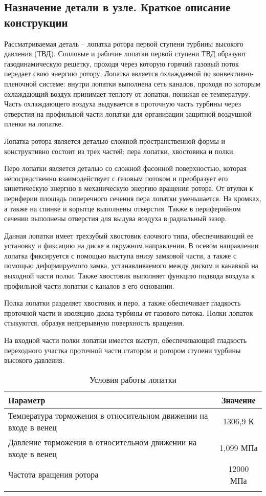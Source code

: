 \subsection{Назначение детали в узле. Краткое описание конструкции}
Рассматриваемая деталь – лопатка ротора первой ступени турбины высокого давления (ТВД). Сопловые и рабочие лопатки первой
ступени ТВД образуют газодинамическую решетку, проходя через которую горячий газовый поток передает свою энергию ротору.
Лопатка является охлаждаемой по конвективно-пленочной системе: внутри лопатки выполнена сеть каналов, проходя по которым
охлаждающий воздух принимает теплоту от лопатки, понижая ее температуру. Часть охлаждающего воздуха выдувается в проточную
часть турбины через отверстия на профильной части лопатки для организации защитной воздушной пленки на лопатке.

Лопатка ротора является деталью сложной пространственной формы и конструктивно состоит из трех частей: пера лопатки, хвостовика и полки.

Перо лопатки является деталью со сложной фасонной поверхностью, которая непосредственно взаимодействует с газовым потоком
и преобразует его кинетическую энергию в механическую энергию вращения ротора. От втулки к периферии площадь поперечного
сечения пера лопатки уменьшается. На кромках, а также на спинке и корытце выполнены отверстия. Также в периферийном сечении
выполнены отверстия для выдува воздуха в радиальный зазор.

Данная лопатки имеет трехзубый хвостовик елочного типа, обеспечивающий ее установку и фиксацию на диске в окружном направлении.
В осевом направлении лопатка фиксируется с помощью выступа внизу замковой части, а также с помощью деформируемого замка,
устанавливаемого между диском и канавкой на выходной части полки. Также хвостовик выполняет функцию подвода воздуха к
профильной части лопатки с каналов в его основании.

Полка лопатки разделяет хвостовик и перо, а также обеспечивает гладкость проточной части и изоляцию диска турбины от газового
потока. Полки лопаток стыкуются, образуя непрерывную поверхность вращения.

На входной части полки лопатки имеется выступ, обеспечивающий гладкость переходного участка проточной части статором и
ротором ступени турбины высокого давления.

\begin{longtable}{|p{12cm}|c|}
	\hline
	\textbf{Параметр} & \textbf{Значение} \\ \hline
	\endhead
	Температура торможения в относительном движении на входе в венец & 1306,9 К \\ \hline
	Давление торможения в относительном движении на входе в венец & 1,099 МПа \\ \hline
	Частота вращения ротора & 12000 МПа \\ \hline
	\caption{Условия работы лопатки} \label{tab:technology-env-parameters}
\end{longtable}

